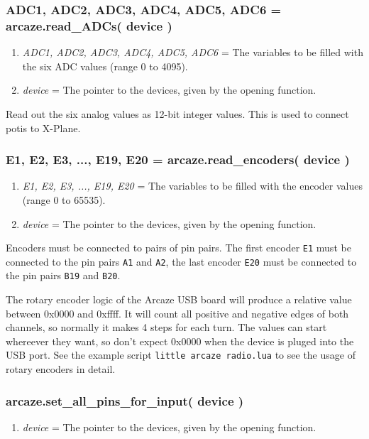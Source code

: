 \documentclass[11pt,parskip=half,a4paper]{scrartcl}
\begin{document}
\subsubsection{ADC1, ADC2, ADC3, ADC4, ADC5, ADC6 = arcaze.read\_ADCs( device )}

\begin{enumerate}
\item \emph{ADC1, ADC2, ADC3, ADC4, ADC5, ADC6} = The variables to be filled with the six ADC values (range 0 to 4095).
\item \emph{device} = The pointer to the devices, given by the opening function.
\end{enumerate}

Read out the six analog values as 12-bit integer values. This is used to connect potis to X-Plane.


\subsubsection{E1, E2, E3, ..., E19, E20 = arcaze.read\_encoders( device )}

\begin{enumerate}
\item \emph{E1, E2, E3, ..., E19, E20} = The variables to be filled with the encoder values (range 0 to 65535).
\item \emph{device} = The pointer to the devices, given by the opening function.
\end{enumerate}

Encoders must be connected to pairs of pin pairs. The first encoder \verb|E1| must be connected to the pin pairs \verb|A1| and \verb|A2|, the last encoder \verb|E20| must be connected to the pin pairs \verb|B19| and \verb|B20|.

The rotary encoder logic of the Arcaze USB board will produce a relative value between 0x0000 and 0xffff. It will count all positive and negative edges of both channels, so normally it makes 4 steps for each turn. The values can start whereever they want, so don't expect 0x0000 when the device is pluged into the USB port. See the example script \verb|little arcaze radio.lua| to see the usage of rotary encoders in detail.


\subsubsection{arcaze.set\_all\_pins\_for\_input( device )}

\begin{enumerate}
\item \emph{device} = The pointer to the devices, given by the opening function.
\end{enumerate}
\end{document}
